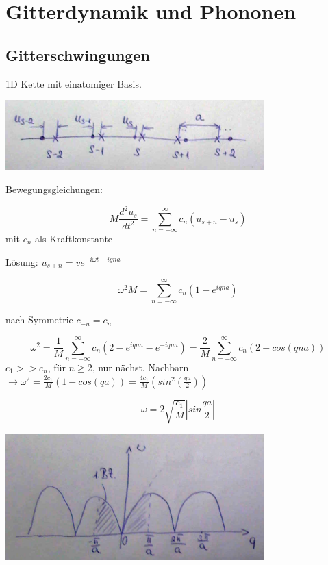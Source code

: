 



\tableofcontents
\setcounter{chapter}{5}
\chapter{Gitterdynamik und Phononen}

\section{Gitterschwingungen}

1D Kette mit einatomiger Basis. 

\includegraphics[width=0.75\textwidth]{kap06_01.png}

Bewegungsgleichungen:

\[ M\frac{d^2 u_s}{dt^2} = \sum^{\infty}_{n=-\infty}c_n(u_{s+n}-u_s)\]
mit \(c_n\) als Kraftkonstante

Lösung: \(u_{s+n}=v e^{-i\omega t + igna}\)

\[\omega^2 M = \sum^{\infty}_{n=-\infty}c_n(1-e^{iqna})\]

nach Symmetrie \(c_{-n}=c_n\)

\[\omega^2 = \frac{1}{M} \sum^{\infty}_{n=-\infty}c_n(2-e^{iqna}-e^{-iqna})=\frac{2}{M} \sum^{\infty}_{n=-\infty}c_n(2-cos(qna))\]
\(c_1 >> c_n\), für  \(n\geq 2\), nur nächst. Nachbarn \(\rightarrow \omega^2=\frac{2c_1}{M} (1-cos(qa)) =\frac{4c_1}{M} (sin^2(\frac{qa}{2}))\)

\[\omega = 2\sqrt{\frac{c_1}{M}}\left| sin\frac{qa}{2}\right|\]

\includegraphics[width=0.75\textwidth]{kap06_02.png}

